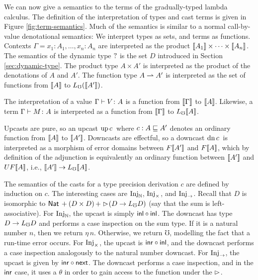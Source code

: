 We can now give a semantics to the terms of the gradually-typed lambda calculus.
The definition of the interpretation of types and cast terms is given in Figure
\ref{fig:term-semantics}.
%
Much of the semantics is similar to a normal call-by-value denotational
semantics: We interpret types as sets, and terms as functions. Contexts $\Gamma
= x_1 \colon A_1, \dots, x_n \colon A_n$ are interpreted as the product
$\llbracket {A_1} \rrbracket \times \cdots \times \llbracket {A_n} \rrbracket$. The semantics of the dynamic type
$?$ is the set $D$ introduced in Section \ref{sec:dynamic-type}. The product
type $A \times A'$ is interpreted as the product of the denotations of $A$ and
$A'$. The function type $A \rightharpoonup A'$ is interpreted as the set of functions from
$\llbracket {A} \rrbracket$ to $L_\mho (\llbracket {A'} \rrbracket)$.

The interpretation of a value ${\Gamma} \vdash {V} \colon {A}$ is a function from
$\llbracket {\Gamma} \rrbracket$ to $\llbracket {A} \rrbracket$. Likewise, a term ${\Gamma} \vdash {M} \colon {{A}}$ is
interpreted as a function from $\llbracket {\Gamma} \rrbracket$ to $L_\mho \llbracket {A} \rrbracket$.

Upcasts are pure, so an upcast $\text{up}\,{c}\,$ where $c : A \sqsubseteq A'$ denotes an
ordinary function from $\llbracket {A} \rrbracket$ to $\llbracket {A'} \rrbracket$. Downcasts are effectful, so a
downcast $\text{dn}\,{c}\,$ is interpreted as a morphism of error domains between
$F\llbracket {A'} \rrbracket$ and $F\llbracket {A} \rrbracket$, which by definition of the adjunction is
equivalently an ordinary function between $\llbracket {A'} \rrbracket$ and $UF\llbracket {A} \rrbracket$, i.e.,
$\llbracket {A'} \rrbracket \to L_\mho \llbracket {A} \rrbracket$.

The semantics of the casts for a type precision derivation $c$ are defined by
induction on $c$. The interesting cases are $\text{Inj}_\mathbb{N}$, $\text{Inj}_\times$, and $\text{Inj}_\to$.
Recall that $D$ is isomorphic to $\mathsf{Nat}\, + (D \times D)\, + \vartriangleright \hspace{-0.2em} (D \to L_\mho
D)$ (say that the sum is left-associative).
%
For $\text{Inj}_\mathbb{N}$, the upcast is simply $\mathsf{inl} \circ \mathsf{inl}$. The downcast has type $D
\to L_\mho D$ and performs a case inspection on the sum type. If it is a natural
number $n$, then we return $\eta\, n$. Otherwise, we return $\mho$, modelling
the fact that a run-time error occurs.
%
For $\text{Inj}_\times$, the upcast is $\mathsf{inr} \circ \mathsf{inl}$, and the downcast performs a case
inspection analogously to the natural number downcast.
%
For $\text{Inj}_\to$, the upcast is given by $\mathsf{inr} \circ \mathsf{next}$. The downcast performs a
case inspection, and in the $\mathsf{inr}$ case, it uses a $\theta$ in order to gain
access to the function under the $\vartriangleright$.
%






